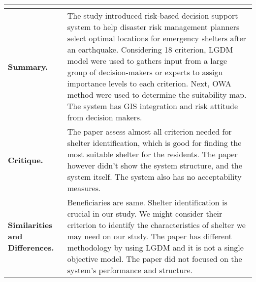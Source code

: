 \begin{longtable}{|L{.2\linewidth}|L{.74\linewidth}|}
	\hline
	\\ \hline
	\textbf{Summary.} & The study introduced risk-based decision support system to help disaster risk management planners select optimal locations for emergency shelters after an earthquake. Considering 18 criterion, LGDM model were used to gathers input from a large group of decision-makers or experts to assign importance levels to each criterion. Next, OWA method were used to determine the suitability map. The system has GIS integration and risk attitude from decision makers.\\ \hline
	\textbf{Critique.} & The paper assess almost all criterion needed for shelter identification, which is good for finding the most suitable shelter for the residents. The paper however didn't show the system structure, and the system itself. The system also has no acceptability measures.\\ \hline
	\textbf{Similarities and Differences.} & Beneficiaries are same. Shelter identification is crucial in our study. We might consider their criterion to identify the characteristics of shelter we may need on our study. The paper has different methodology by using LGDM and it is not a single objective model. The paper did not focused on the system's performance and structure. \\ \hline
\end{longtable}
